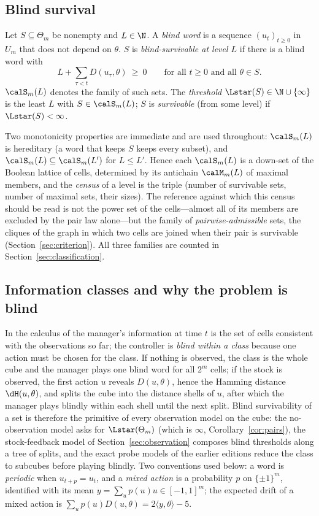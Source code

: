\subsection{Blind survival}
\begin{definition}\label{def:blind}
Let $S\subseteq\Theta_m$ be nonempty and $L\in\N$. A \emph{blind word} is a sequence $(u_t)_{t\ge0}$ in $U_m$ that does not depend on $\theta$. $S$ is \emph{blind-survivable at level $L$} if there is a blind word with
\[L+\sum_{\tau<t}D(u_\tau,\theta)\ \ge\ 0\qquad\text{for all }t\ge0\text{ and all }\theta\in S .\]
$\calS_m(L)$ denotes the family of such sets. The \emph{threshold} $\Lstar(S)\in\N\cup\{\infty\}$ is the least $L$ with $S\in\calS_m(L)$; $S$ is \emph{survivable} (from some level) if $\Lstar(S)<\infty$.
\end{definition}

Two monotonicity properties are immediate and are used throughout: $\calS_m(L)$ is hereditary (a word that keeps $S$ keeps every subset), and $\calS_m(L)\subseteq\calS_m(L')$ for $L\le L'$. Hence each $\calS_m(L)$ is a down-set of the Boolean lattice of cells, determined by its antichain $\calM_m(L)$ of maximal members, and the \emph{census} of a level is the triple (number of survivable sets, number of maximal sets, their sizes). The reference against which this census should be read is not the power set of the cells---almost all of its members are excluded by the pair law alone---but the family of \emph{pairwise-admissible} sets, the cliques of the graph in which two cells are joined when their pair is survivable (Section~\ref{sec:criterion}). All three families are counted in Section~\ref{sec:classification}.

\subsection{Information classes and why the problem is blind}
In the calculus of \cite{Abaee2026calc} the manager's information at time $t$ is the set of cells consistent with the observations so far; the controller is \emph{blind within a class} because one action must be chosen for the class. If nothing is observed, the class is the whole cube and the manager plays one blind word for all $2^m$ cells; if the stock is observed, the first action $u$ reveals $D(u,\theta)$, hence the Hamming distance $\dH(u,\theta)$, and splits the cube into the distance shells of $u$, after which the manager plays blindly within each shell until the next split. Blind survivability of a set is therefore the primitive of every observation model on the cube: the no-observation model asks for $\Lstar(\Theta_m)$ (which is $\infty$, Corollary~\ref{cor:pairs}), the stock-feedback model of Section~\ref{sec:observation} composes blind thresholds along a tree of splits, and the exact probe models of the earlier editions reduce the class to subcubes before playing blindly. Two conventions used below: a word is \emph{periodic} when $u_{t+p}=u_t$, and a \emph{mixed action} is a probability $p$ on $\{\pm1\}^m$, identified with its mean $y=\sum_u p(u)u\in[-1,1]^m$; the expected drift of a mixed action is $\sum_up(u)D(u,\theta)=2\langle y,\theta\rangle-5$.

